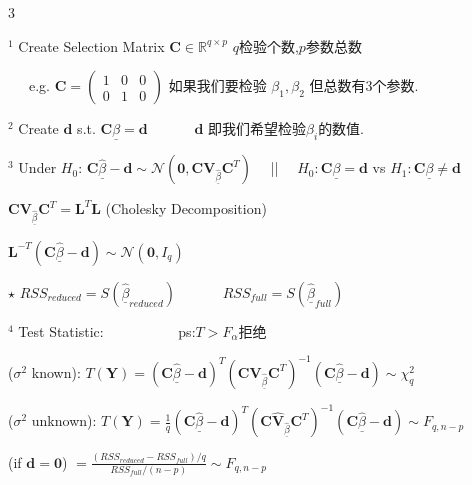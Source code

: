 \documentclass[9pt]{article}
\begin{document}
{
\setlength{\parindent}{0pt}
\footnotesize
\vspace{-12pt}
\begin{multicols}{3}

$^1$ Create Selection Matrix $\mathbf{C}\in\mathbb{R}^{q\times p}$ {\tiny $q$检验个数,$p$参数总数}
    
\ \ \ e.g. $\mathbf{C}=\begin{pmatrix}1 & 0 & 0 \\ 0 & 1 & 0\end{pmatrix}$ {\tiny 如果我们要检验 $\beta_1,\beta_2$ 但总数有3个参数.}

$^2$ Create $\mathbf{d}$ s.t. $\mathbf{C}\underline{\beta}=\mathbf{d}$ \ \ \ \ \ \ {\tiny $\mathbf{d}$ 即我们希望检验$\beta_i$的数值.}

\columnbreak

$^3$ Under $H_0$: {\tiny $\mathbf{C}\underline{\widehat{\beta}}-\mathbf{d}\sim\mathcal{N}(\mathbf{0},\mathbf{C}\mathbf{V}_{\underline{\widehat{\beta}}}\mathbf{C}^T)$} \ \ || \ \ {\tiny $H_0:\mathbf{C}\underline{\beta}=\mathbf{d}$ vs $H_1:\mathbf{C}\underline{\beta}\ne\mathbf{d}$}

\hspace{40pt} {\tiny $\mathbf{C}\mathbf{V}_{\underline{\widehat{\beta}}}\mathbf{C}^T=\mathbf{L}^T\mathbf{L}$ (Cholesky Decomposition)}

\hspace{40pt} {\tiny $\mathbf{L}^{-T}(\mathbf{C}\underline{\widehat{\beta}}-\mathbf{d})\sim\mathcal{N}(\mathbf{0},I_q)$}

\hspace{40pt} $\star$ {\tiny $RSS_{reduced}=S(\underline{\widehat{\beta}}_{reduced})$ \ \ \ \ \ \ $RSS_{full}=S(\underline{\widehat{\beta}}_{full})$}

\columnbreak

$^4$ Test Statistic:  \ \ \ \ \ \ \ \ \ \ {\tiny ps:$T>F_{\alpha}$拒绝}

{\tiny ($\sigma^2$ known):} {\scriptsize $T(\mathbf{Y})=(\mathbf{C}\underline{\widehat{\beta}}-\mathbf{d})^T(\mathbf{C}\mathbf{V}_{\underline{\widehat{\beta}}}\mathbf{C}^T)^{-1}(\mathbf{C}\underline{\widehat{\beta}}-\mathbf{d})\sim\chi^2_{q}$}

{\tiny ($\sigma^2$ unknown):} {\scriptsize $T(\mathbf{Y})=\frac{1}{q}(\mathbf{C}\underline{\widehat{\beta}}-\mathbf{d})^T(\mathbf{C}\widehat{\mathbf{V}}_{\underline{\widehat{\beta}}}\mathbf{C}^T)^{-1}(\mathbf{C}\underline{\widehat{\beta}}-\mathbf{d})\sim F_{q,n-p}$}

\hspace{21pt} {\scriptsize (if $\mathbf{d=0}$) $=\frac{(RSS_{reduced}-RSS_{full})/q}{RSS_{full}/(n-p)}\sim F_{q,n-p}$}

\end{multicols}
\vspace{-12pt}
}
\end{document}
